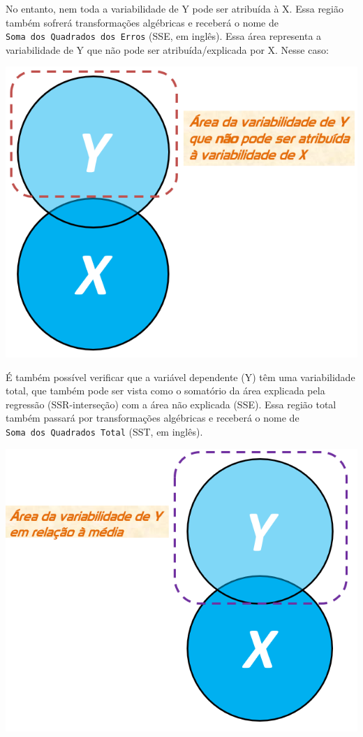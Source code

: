 \documentclass[
]{book}
\begin{document}
No entanto, nem toda a variabilidade de Y pode ser atribuída à X. Essa região também sofrerá transformações algébricas e receberá o nome de \texttt{Soma\ dos\ Quadrados\ dos\ Erros} (SSE, em inglês). Essa área representa a variabilidade de Y que não pode ser atribuída/explicada por X. Nesse caso:

\includegraphics{./img/cap_reg_x_y_SSE.png}

É também possível verificar que a variável dependente (Y) têm uma variabilidade total, que também pode ser vista como o somatório da área explicada pela regressão (SSR-interseção) com a área não explicada (SSE). Essa região total também passará por transformações algébricas e receberá o nome de \texttt{Soma\ dos\ Quadrados\ Total} (SST, em inglês).

\includegraphics{./img/cap_reg_x_y_SST.png}
\end{document}
